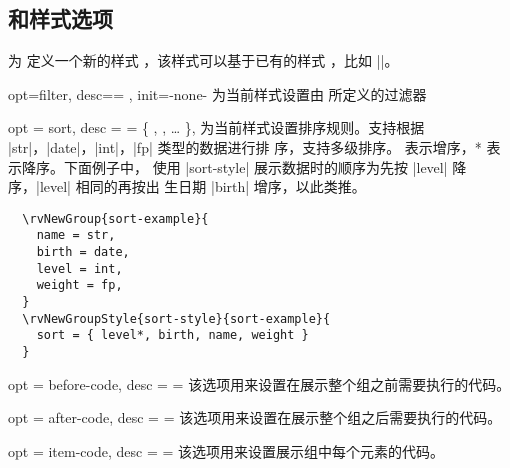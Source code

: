 \documentclass[full]{l3doc}
\begin{document}
\begin{documentation}
\subsection{ 和样式选项}

\begin{function}{\rvNewGroupStyle}
  \begin{syntax}
        
  \end{syntax}

  为  定义一个新的样式 ，该样式可以基于已有的样式
  ，比如 ||。
\end{function}

\bigskip

\begin{option}{opt=filter, desc={= }, init=-none-}
  为当前样式设置由  所定义的过滤器
\end{option}

\begin{option}{
  opt = sort,
  desc = {= \{ , , \ldots{} \}},
}
  为当前样式设置排序规则。支持根据 |str|，|date|，|int|，|fp| 类型的数据进行排
  序，支持多级排序。 表示增序，* 表示降序。下面例子中，
  使用 |sort-style| 展示数据时的顺序为先按 |level| 降序，|level| 相同的再按出
  生日期 |birth| 增序，以此类推。
\end{option}

\begin{verbatim}
  \rvNewGroup{sort-example}{
    name = str,
    birth = date,
    level = int,
    weight = fp,
  }
  \rvNewGroupStyle{sort-style}{sort-example}{
    sort = { level*, birth, name, weight }
  }
\end{verbatim}

\begin{option}{
  opt = before-code,
  desc = {= }
}
  该选项用来设置在展示整个组之前需要执行的代码。
\end{option}

\begin{option}{
  opt = after-code,
  desc = {= }
}
  该选项用来设置在展示整个组之后需要执行的代码。
\end{option}

\begin{option}{
  opt = item-code,
  desc = {= }
}
  该选项用来设置展示组中每个元素的代码。
\end{option}


\end{documentation}
\end{document}
